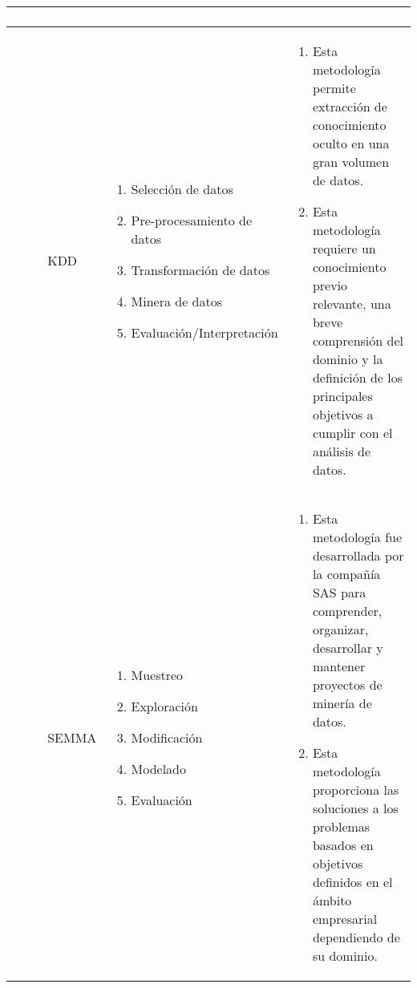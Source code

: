 \begin{table*}[!htb]
\begin{threeparttable}
\begin{tabular}{ p{1cm} p{2cm} p{5cm} p{6.5cm}   }
\begin{enumerate}
			\end{enumerate}
			\\ \hline
			\cite{Safhi2019}
			& KDD
			&  \begin{enumerate}
				\item Selección de datos  
				\item Pre-procesamiento de datos 
				\item Transformación de datos
				\item Minera de datos 
				\item Evaluación/Interpretación
			\end{enumerate}
			& \begin{enumerate}
				\item Esta metodología permite extracción de conocimiento oculto en una gran volumen de datos. 
				\item Esta metodología requiere un conocimiento previo relevante, una breve comprensión del dominio y la definición de los principales objetivos a cumplir con el análisis de datos. 
			\end{enumerate}
			\\ \hline
			\cite{Shafique2014}
			& SEMMA
			&  \begin{enumerate}
				\item Muestreo 
				\item Exploración
				\item Modificación
				\item Modelado
				\item Evaluación
			\end{enumerate}
			& \begin{enumerate}
				\item Esta metodología fue desarrollada por la compañía SAS para comprender, organizar, desarrollar y mantener proyectos de minería de datos.
				\item Esta metodología proporciona las soluciones a los problemas basados en objetivos definidos en el ámbito empresarial dependiendo de su dominio.
			\end{enumerate}
		\end{tabular}
	\end{threeparttable}
\end{table*}

